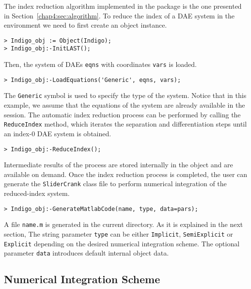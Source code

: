 The index reduction algorithm implemented in the \Indigo{} \Maple{} package is the one presented in Section~\ref{chap4:sec:algorithm}. To reduce the index of a \ac{DAE} system in the \Maple{} environment we need to first create an \Indigo{} object instance.
%
\begin{verbatim}
> Indigo_obj := Object(Indigo);
> Indigo_obj:-InitLAST();
\end{verbatim}
%
Then, the system of \acp{DAE} \texttt{eqns} with coordinates \texttt{vars} is loaded.
%
\begin{verbatim}
> Indigo_obj:-LoadEquations('Generic', eqns, vars);
\end{verbatim}
%
The \texttt{Generic} symbol is used to specify the type of the system. Notice that in this example, we assume that the equations of the system are already available in the \Maple{} session. The automatic index reduction process can be performed by calling the \texttt{ReduceIndex} method, which iterates the separation and differentiation steps until an index-$0$ \ac{DAE} system is obtained.
%
\begin{verbatim}
> Indigo_obj:-ReduceIndex();
\end{verbatim}
%
Intermediate results of the process are stored internally in the \Indigo{} object and are available on demand. Once the index reduction process is completed, the user can generate the \texttt{SliderCrank} \Matlab{} class file to perform numerical integration of the reduced-index system.
%
\begin{verbatim}
> Indigo_obj:-GenerateMatlabCode(name, type, data=pars);
\end{verbatim}
%
A file \texttt{name.m} is generated in the current directory. As it is explained in the next section, The string parameter \texttt{type} can be either \texttt{Implicit}, \texttt{SemiExplicit} or \texttt{Explicit} depending on the desired numerical integration scheme. The optional parameter \texttt{data} introduces default internal object data.

\subsection{Numerical Integration Scheme}

